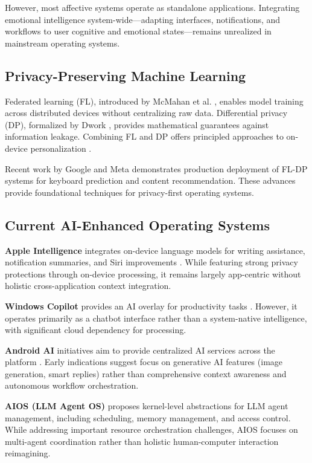 \documentclass[conference]{IEEEtran}
\begin{document}
However, most affective systems operate as standalone applications. Integrating emotional intelligence system-wide—adapting interfaces, notifications, and workflows to user cognitive and emotional states—remains unrealized in mainstream operating systems.

\subsection{Privacy-Preserving Machine Learning}

Federated learning (FL), introduced by McMahan et al. \cite{mcmahan2017communication}, enables model training across distributed devices without centralizing raw data. Differential privacy (DP), formalized by Dwork \cite{dwork2006differential}, provides mathematical guarantees against information leakage. Combining FL and DP offers principled approaches to on-device personalization \cite{kairouz2021advances, wei2024balancing}.

Recent work by Google \cite{girgis2021shuffled} and Meta \cite{kairouz2021practical} demonstrates production deployment of FL-DP systems for keyboard prediction and content recommendation. These advances provide foundational techniques for privacy-first operating systems.

\subsection{Current AI-Enhanced Operating Systems}

\textbf{Apple Intelligence} integrates on-device language models for writing assistance, notification summaries, and Siri improvements \cite{appleIntelligence2024}. While featuring strong privacy protections through on-device processing, it remains largely app-centric without holistic cross-application context integration.

\textbf{Windows Copilot} provides an AI overlay for productivity tasks \cite{microsoftCopilot2024}. However, it operates primarily as a chatbot interface rather than a system-native intelligence, with significant cloud dependency for processing.

\textbf{Android AI} initiatives aim to provide centralized AI services across the platform \cite{androidAI2024}. Early indications suggest focus on generative AI features (image generation, smart replies) rather than comprehensive context awareness and autonomous workflow orchestration.

\textbf{AIOS (LLM Agent OS)} \cite{mei2024aios} proposes kernel-level abstractions for LLM agent management, including scheduling, memory management, and access control. While addressing important resource orchestration challenges, AIOS focuses on multi-agent coordination rather than holistic human-computer interaction reimagining.
\end{document}
